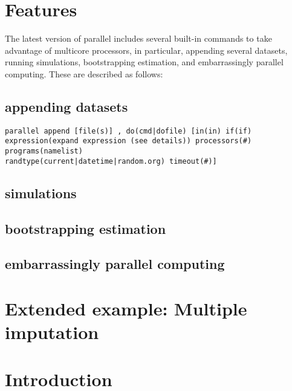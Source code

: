 \documentclass[bib]{statapress}
\begin{document}
\section{Features}

The latest version of parallel includes several built-in commands to take advantage of multicore processors, in particular, appending several datasets, running simulations, bootstrapping estimation, and embarrassingly parallel computing. These are described as follows:

\subsection{appending datasets}

\begin{verbatim}
parallel append [file(s)] , do(cmd|dofile) [in(in) if(if) expression(expand expression (see details)) processors(#) programs(namelist)
randtype(current|datetime|random.org) timeout(#)]

\end{verbatim}

\subsection{simulations}

\subsection{bootstrapping estimation}

\subsection{embarrassingly parallel computing}


\section{Extended example: Multiple imputation}

\section{Introduction}
\end{document}
